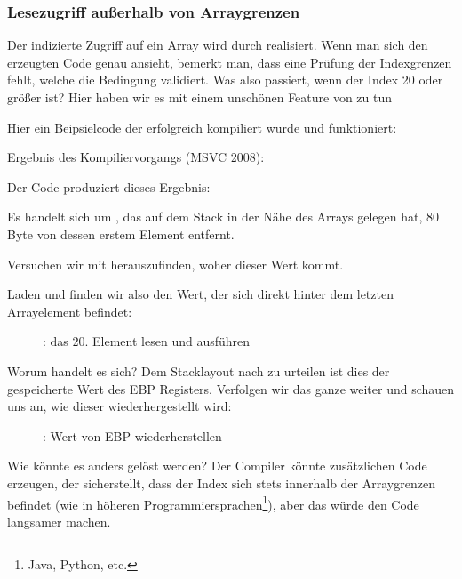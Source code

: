 \subsubsection{Lesezugriff außerhalb von Arraygrenzen}
Der indizierte Zugriff auf ein Array wird durch  realisiert.
Wenn man sich den erzeugten Code genau ansieht, bemerkt man, dass eine Prüfung der Indexgrenzen fehlt, welche die
Bedingung  validiert.
Was also passiert, wenn der Index 20 oder größer ist? 
Hier haben wir es mit einem unschönen Feature von \CCpp zu tun

Hier ein Beipsielcode der erfolgreich kompiliert wurde und funktioniert:



Ergebnis des Kompiliervorgangs (MSVC 2008):



Der Code produziert dieses Ergebnis:


Es handelt sich um , das auf dem Stack in der Nähe des Arrays gelegen hat, 80 Byte von dessen erstem
Element entfernt.

\clearpage
\myindex{\olly}
Versuchen wir mit \olly herauszufinden, woher dieser Wert kommt.

Laden und finden wir also den Wert, der sich direkt hinter dem letzten Arrayelement befindet:

\begin{figure}[H]
\centering
{}
\caption{\olly: das 20. Element lesen und \printf ausführen}
\label{fig:array_BO_olly_r1}
\end{figure}

Worum handelt es sich? 
Dem Stacklayout nach zu urteilen ist dies der gespeicherte Wert des EBP Registers.
\clearpage
Verfolgen wir das ganze weiter und schauen uns an, wie dieser wiederhergestellt wird:

\begin{figure}[H]
\centering
{}
\caption{\olly: Wert von EBP wiederherstellen}
\label{fig:array_BO_olly_r2}
\end{figure}
Wie könnte es anders gelöst werden?
Der Compiler könnte zusätzlichen Code erzeugen, der sicherstellt, dass der Index sich stets innerhalb der Arraygrenzen
befindet (wie in höheren Programmiersprachen\footnote{Java, Python, etc.}), aber das würde den Code langsamer machen.
